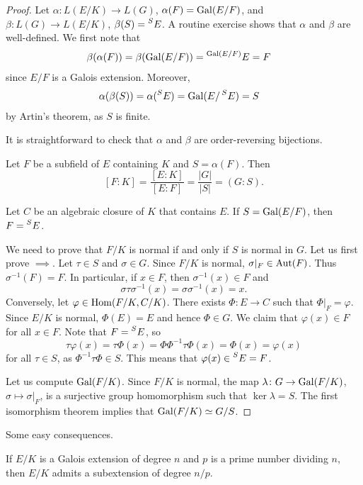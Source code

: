 \begin{proof}
Let $\alpha\colon L(E/K)\to L(G)$, $\alpha(F)=\operatorname{Gal}(E/F)$, and $\beta\colon L(G)\to L(E/K)$, 
$\beta(S)=\prescript{S}{}{E}$. A routine
exercise shows that $\alpha$ and $\beta$ are well-defined. 
We first note that
\begin{align*}
   &\beta(\alpha(F))=\beta(\operatorname{Gal}(E/F))=\prescript{\operatorname{Gal}(E/F)}{}{E}=F
\end{align*}
since $E/F$ is a Galois extension. Moreover,
\begin{align*}
   &\alpha(\beta(S))=\alpha(\prescript{S}{}{E})=\operatorname{Gal}(E/\prescript{S}{}{E})=S
\end{align*}
by Artin's theorem, as $S$ is finite. 

It is straightforward to check that $\alpha$ and $\beta$ are order-reversing bijections. 

Let $F$ be a subfield of $E$ containing $K$ and 
$S=\alpha(F)$. Then
\[
[F:K]=\frac{[E:K]}{[E:F]}=\frac{|G|}{|S|}=(G:S).
\]

Let $C$ be an algebraic closure of $K$ that contains $E$. 
If $S=\operatorname{Gal}(E/F)$, then $F=\prescript{S}{}{E}$. 

We need to prove that $F/K$ is normal if and only if $S$ is normal in $G$. 
Let us first prove $\implies$. Let $\tau\in S$ and $\sigma\in G$. Since
$F/K$ is normal, $\sigma|_F\in\operatorname{Aut}(F)$. Thus $\sigma^{-1}(F)=F$. In particular, 
if $x\in F$, then $\sigma^{-1}(x)\in F$ and 
\[
\sigma\tau\sigma^{-1}(x)=\sigma\sigma^{-1}(x)=x.
\]
Conversely, let $\varphi\in\operatorname{Hom}(F/K,C/K)$. There exists 
$\Phi\colon E\to C$ such that $\Phi|_F=\varphi$. Since $E/K$ is normal, 
$\Phi(E)=E$ and hence $\Phi\in G$. We claim that $\varphi(x)\in F$ for all $x\in F$. 
Note that $F=\prescript{S}{}{E}$, so
 \[
 \tau\varphi(x)=\tau\Phi(x)=\Phi\Phi^{-1}\tau\Phi(x)=\Phi(x)=\varphi(x)
 \]
 for all $\tau\in S$, as $\Phi^{-1}\tau\Phi\in S$. This means that $\varphi(x)\in\prescript{S}{}{E}=F$. 
 
 Let us compute $\operatorname{Gal}(F/K)$. Since $F/K$ is normal, 
 the map 
 $\lambda\colon G\to\operatorname{Gal}(F/K)$, $\sigma\mapsto\sigma|_F$, 
 is a surjective group homomorphism such that $\ker\lambda=S$. The first isomorphism 
 theorem implies that $\operatorname{Gal}(F/K)\simeq G/S$. 
\end{proof}

Some easy consequences.

\begin{exercise}
    If $E/K$ is a Galois extension of degree $n$ and
    $p$ is a prime number dividing $n$, then $E/K$ admits
    a subextension of degree $n/p$. 
\end{exercise}
    
